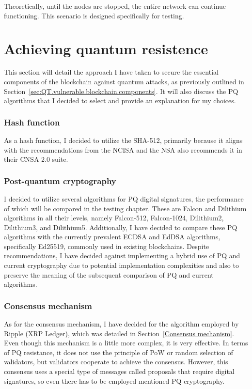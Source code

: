Theoretically, until the nodes are stopped, the entire network can continue functioning. This scenario is designed specifically for testing.


\section{Achieving quantum resistence}
\label{sec:design.QR}

This section will detail the approach I have taken to secure the essential components of the blockchain against quantum attacks, as previously outlined in Section~\ref{sec:QT.vulnerable.blockchain.components}. It will also discuss the PQ algorithms that I decided to select and provide an explanation for my choices.

\subsubsection{Hash function}

As a hash function, I decided to utilize the SHA-512, primarily because it aligns with the recommendations from the NCISA and the NSA also recommends it in their CNSA 2.0 suite.

\subsubsection{Post-quantum cryptography}

I decided to utilize several algorithms for PQ digital signatures, the performance of which will be compared in the testing chapter. These are Falcon and Dilithium algorithms in all their levels, namely Falcon-512, Falcon-1024, Dilithium2, Dilithium3, and Dilithium5. Additionally, I have decided to compare these PQ algorithms with the currently prevalent ECDSA and EdDSA algorithms, specifically Ed25519, commonly used in existing blockchains. Despite recommendations, I have decided against implementing a hybrid use of PQ and current cryptography due to potential implementation complexities and also to preserve the meaning of the subsequent comparison of PQ and current algorithms.

\subsubsection{Consensus mechanism}

As for the consensus mechanism, I have decided for the algorithm employed by Ripple (XRP Ledger), which was detailed in Section~\ref{Consensus mechanism}. Even though this mechanism is a little more complex, it is very effective. In terms of PQ resistance, it does not use the principle of PoW or random selection of validators, but validators cooperate to achieve the consensus. However, this consensus uses a special type of messages called proposals that require digital signatures, so even there has to be employed mentioned PQ cryptography.

